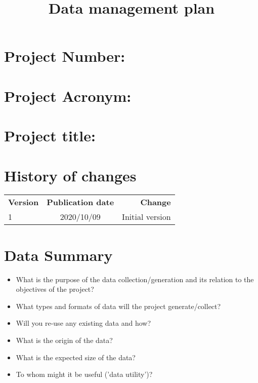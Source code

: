\documentclass{article}
\title{Data management plan}
\author{}
\date{}
\begin{document}
\begin{titlepage}
\maketitle
\bigskip
\section*{Project  Number:}
\section*{Project Acronym:}
\section*{Project title:} 
\bigskip
\section*{History of changes}
\begin{tabular}{ l | c | r }
   \textbf{Version} & \textbf{Publication date} & \textbf{Change} \\
   1 & 2020/10/09 & Initial version \\
\end{tabular}
\end{titlepage}

\newpage
\tableofcontents
\newpage

\section{Data Summary}
\begin{itemize}
\item What is the purpose of the data collection/generation and its relation to the objectives of the project?
\item What types and formats of data will the project generate/collect?
\item Will you re-use any existing data and how?
\item What is the origin of the data?
\item What is the expected size of the data?
\item To whom might it be useful ('data utility')?
\end{itemize}
\end{document}
